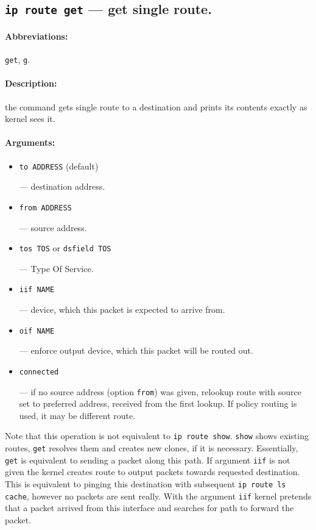 \subsection{{\tt ip route get} --- get single route.}
\label{IP-ROUTE-GET}

\paragraph{Abbreviations:} \verb|get|, \verb|g|.

\paragraph{Description:} the command gets single route to a destination
and prints its contents exactly as kernel sees it.

\paragraph{Arguments:} 
\begin{itemize}
\item \verb|to ADDRESS| (default)

--- destination address.

\item \verb|from ADDRESS|

--- source address.

\item \verb|tos TOS| or \verb|dsfield TOS|

--- Type Of Service.

\item \verb|iif NAME|

--- device, which this packet is expected to arrive from.

\item \verb|oif NAME|

--- enforce output device, which this packet will be routed out.

\item \verb|connected|

--- if no source address (option \verb|from|) was given, relookup
route with source set to preferred address, received from the first lookup.
If policy routing is used, it may be different route.

\end{itemize}

Note that this operation is not equivalent to \verb|ip route show|.
\verb|show| shows existing routes, \verb|get| resolves them and
creates new clones, if it is necessary. Essentially, \verb|get|
is equivalent to sending a packet along this path.
If argument \verb|iif| is not given the kernel creates route
to output packets towards requested destination.
This is equivalent to pinging this destination
with subsequent {\tt ip route ls cache}, however no packets are
sent really. With the argument \verb|iif| kernel pretends
that a packet arrived from this interface and searches for
path to forward the packet.

